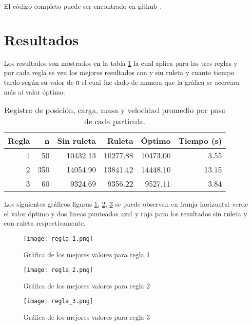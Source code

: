 \documentclass[a4paper, 11pt]{article}
\begin{document}
El código completo puede ser encontrado en github \cite{Edson}.

\section{Resultados}

Los resultados son mostrados en la tabla \ref{tab1} la cual aplica para las tres reglas y por cada regla se ven los mejores resultados con y sin ruleta y cuanto tiempo tardo según su valor de \texttt{n} el cual fue dado de manera que la gráfica se acercara más al valor óptimo. 

    \begin{table}[H]
        \caption{Registro de posición, carga, masa y velocidad promedio por paso de cada partícula.}
        \bigskip
        \label{tab1}
        \centering
        \begin{tabular}{|r|r|r|r|r|r|}
        \hline
         Regla&n&Sin ruleta&Ruleta&Óptimo&Tiempo (s)\\
        \hline
        1 & 50 & 10432.13 & 10277.88 & 10473.00 & 3.55 \\
        \hline
        2 & 350 & 14054.90 & 13841.42 & 14448.10 & 13.15 \\
        \hline
        3 & 60 & 9324.69 & 9356.22 & 9527.11 & 3.84 \\
        \hline
        \end{tabular}
    \end{table}

Los siguientes gráficos figuras \ref{f1}, \ref{f2}, \ref{f3} se puede observan en franja horizontal verde el valor óptimo y dos lineas punteadas azul y roja para los resultados sin ruleta y con ruleta respectivamente.

\begin{figure}[H]
  \centering      
  \texttt{[image: regla\_1.png]}
  \caption{Gráfica de los mejores valores para regla 1}
  \label{f1}
\end{figure}
\bigskip

\begin{figure}[H]
  \centering      
  \texttt{[image: regla\_2.png]}
  \caption{Gráfica de los mejores valores para regla 2}
  \label{f2}
\end{figure}
\bigskip

\begin{figure}[H]
  \centering      
  \texttt{[image: regla\_3.png]}
  \caption{Gráfica de los mejores valores para regla 3}
  \label{f3}
\end{figure}
\bigskip
\end{document}
